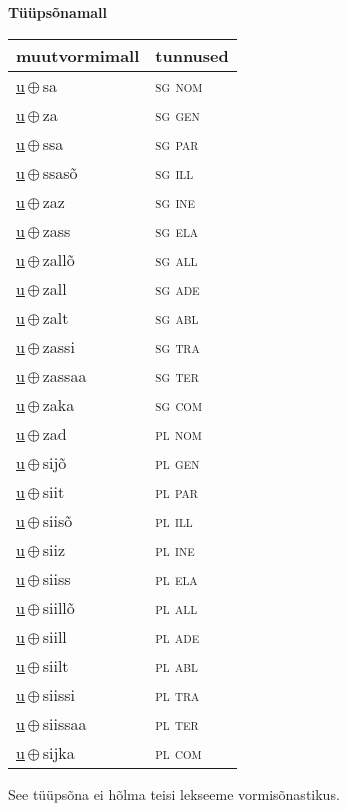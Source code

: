 

\vspace{3.5em}
\noindent \begin{minipage}{\textwidth}
\noindent \textbf{Tüüpsõnamall \,}\\

\begin{sideways}
\begin{tabular}{l l}
muutvormimall & tunnused \\
\hline
\underline{u}\,$\oplus$\,sa & \textsc{ sg nom } \\
\underline{u}\,$\oplus$\,za & \textsc{ sg gen } \\
\underline{u}\,$\oplus$\,ssa & \textsc{ sg par } \\
\underline{u}\,$\oplus$\,ssasõ & \textsc{ sg ill } \\
\underline{u}\,$\oplus$\,zaz & \textsc{ sg ine } \\
\underline{u}\,$\oplus$\,zass & \textsc{ sg ela } \\
\underline{u}\,$\oplus$\,zallõ & \textsc{ sg all } \\
\underline{u}\,$\oplus$\,zall & \textsc{ sg ade } \\
\underline{u}\,$\oplus$\,zalt & \textsc{ sg abl } \\
\underline{u}\,$\oplus$\,zassi & \textsc{ sg tra } \\
\underline{u}\,$\oplus$\,zassaa & \textsc{ sg ter } \\
\underline{u}\,$\oplus$\,zaka & \textsc{ sg com } \\
\underline{u}\,$\oplus$\,zad & \textsc{ pl nom } \\
\underline{u}\,$\oplus$\,sijõ & \textsc{ pl gen } \\
\underline{u}\,$\oplus$\,siit & \textsc{ pl par } \\
\underline{u}\,$\oplus$\,siisõ & \textsc{ pl ill } \\
\underline{u}\,$\oplus$\,siiz & \textsc{ pl ine } \\
\underline{u}\,$\oplus$\,siiss & \textsc{ pl ela } \\
\underline{u}\,$\oplus$\,siillõ & \textsc{ pl all } \\
\underline{u}\,$\oplus$\,siill & \textsc{ pl ade } \\
\underline{u}\,$\oplus$\,siilt & \textsc{ pl abl } \\
\underline{u}\,$\oplus$\,siissi & \textsc{ pl tra } \\
\underline{u}\,$\oplus$\,siissaa & \textsc{ pl ter } \\
\underline{u}\,$\oplus$\,sijka & \textsc{ pl com } \\
\end{tabular}
\end{sideways}
\label{tab:tüüpsõnamall-usa}

\end{minipage}

 
\vspace{1em}
\noindent See tüüpsõna ei hõlma teisi lekseeme vormi\-sõnastikus.
